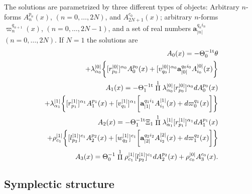 \documentclass[prd,a4paper,twocolumn,amssymb,amsmath,nofootinbib,showpacs]{revtex4}
\begin{document}
\noindent The solutions are parametrized by three different types
of objects: Arbitrary $n$-forms $A_n^{p_n}(x)$, $(n=0,\ldots,2N)$,
and $A_{2N+1}^{c_0}(x)$; arbitrary $n$-forms
$\varpi_n^{q_{n+1}}(x)$, $(n=0,\ldots,2N-1)$, and a set of real
numbers $\mathbf{a}_{|n|}^{q_ni_n}$ $(n=0,\ldots,2N)$. If $N=1$
the solutions are
\begin{eqnarray*}
&&\hspace{-.3cm}A_0(x)=-\Theta_0^{-1\rm{t}}\theta\nonumber\\
&&\hspace{1.8cm}+\lambda^{|0|}_{\alpha_0}\bigg\{
[r_{p_0}^{|0|}]^{\alpha_0}A_0^{p_0}(x)+[v_{q_0}^{|0|}]^{\alpha_0}
\mathbf{a}_{|0|}^{q_0i_0}A_{i_0}^{|0|}(x)\bigg\}\nonumber\\
&&\hspace{-.3cm}A_1(x)=-\Theta_1^{-1\rm{t}}\stackrel{1}{\Pi}
\lambda^{|0|}_{\alpha_0}
[r_{p_0}^{|0|}]^{\alpha_0}dA_0^{p_0}(x)\nonumber\\
&&\hspace{-.3cm}+\lambda^{|1|}_{\alpha_1}\bigg\{
[r_{p_1}^{|1|}]^{\alpha_1}A_1^{p_1}(x)+[v_{q_1}^{|1|}]^{\alpha_1}\bigg[
\mathbf{a}_{|1|}^{q_1i_1}A_{i_1}^{|1|}(x)+d\varpi_0^{q_1}(x)\bigg]\bigg\}
\nonumber\\
&&\hspace{-.3cm}A_2(x)=-\Theta_1^{-1\rm{t}}\Xi_1\stackrel{1}{\Pi}
\lambda^{|1|}_{\alpha_1}
[r_{p_1}^{|1|}]^{\alpha_1}dA_1^{p_1}(x)\nonumber\\
&&\hspace{-.2cm}+\rho^{|1|}_{c_1}\bigg\{
[l_{p_2}^{|1|}]^{c_1}A_2^{p_2}(x)+[w_{q_2}^{|1|}]^{c_1}\bigg[
\mathbf{a}_{|2|}^{q_2i_2}A_{i_2}^{|2|}(x)+d\varpi_1^{q_2}(x)\bigg]\bigg\}
\nonumber\\
&&\hspace{-.3cm}A_3(x)=\Theta_0^{-1}\stackrel{1}{\Pi}
\rho_{c_1}^{|1|}[l^{|1|}_{p_2}]^{c_1}dA_2^{p_2}(x)+\rho_{c_0}^{|0|}A_3^{c_0}(x).
\noindent
\end{eqnarray*}

\subsection{\label{symplecticodd} Symplectic structure}
\end{document}

